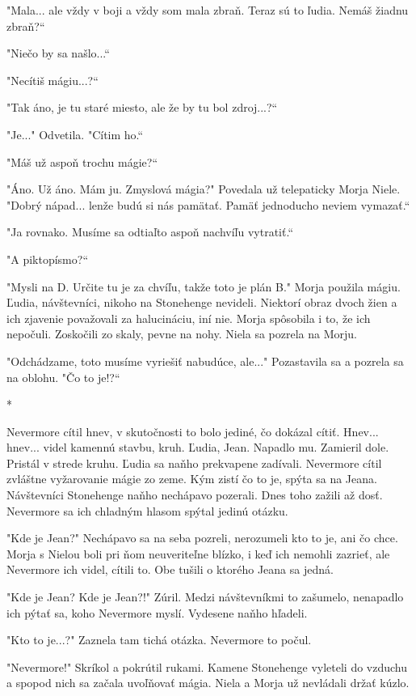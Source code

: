 \documentclass{book}
\begin{document}
"Mala... ale vždy v boji a vždy som mala zbraň. Teraz sú to ľudia. Nemáš žiadnu zbraň?“

"Niečo by sa našlo...“

"Necítiš mágiu...?“

"Tak áno, je tu staré miesto, ale že by tu bol zdroj...?“

"Je..."$ $ Odvetila. "Cítim ho.“

"Máš už aspoň trochu mágie?“

"Áno. Už áno. Mám ju. Zmyslová mágia?"$ $ Povedala už telepaticky Morja Niele. "Dobrý nápad... lenže budú si nás pamätať. Pamäť jednoducho neviem vymazať.“

"Ja rovnako. Musíme sa odtiaľto aspoň nachvíľu vytratiť.“

"$ $A piktopísmo?“

"Mysli na D. Určite tu je za chvíľu, takže toto je plán B."$ $ Morja použila mágiu. Ľudia, návštevníci, nikoho na Stonehenge nevideli. Niektorí obraz dvoch žien a ich zjavenie považovali za halucináciu, iní nie. Morja spôsobila i to, že ich nepočuli. Zoskočili zo skaly, pevne na nohy. Niela sa pozrela na Morju.

"$ $Odchádzame, toto musíme vyriešiť nabudúce, ale..."$ $ Pozastavila sa a pozrela sa na oblohu. "Čo to je!?“

\begin{center}
*
\end{center}

Nevermore cítil hnev, v skutočnosti to bolo jediné, čo dokázal cítiť. Hnev... hnev... videl kamennú stavbu, kruh. Ľudia, Jean. Napadlo mu. Zamieril dole. Pristál v strede kruhu. Ľudia sa naňho prekvapene zadívali. Nevermore cítil zvláštne vyžarovanie mágie zo zeme. Kým zistí čo to je, spýta sa na Jeana. Návštevníci Stonehenge naňho nechápavo pozerali. Dnes toho zažili až dosť. Nevermore sa ich chladným hlasom spýtal jedinú otázku.

"Kde je Jean?"$ $ Nechápavo sa na seba pozreli, nerozumeli kto to je, ani čo chce. Morja s Nielou boli pri ňom neuveriteľne blízko, i keď ich nemohli zazrieť, ale Nevermore ich videl, cítili to. Obe tušili o ktorého Jeana sa jedná.

"Kde je Jean? Kde je Jean?!"$ $ Zúril. Medzi návštevníkmi to zašumelo, nenapadlo ich pýtať sa, koho Nevermore myslí. Vydesene naňho hľadeli.

"Kto to je...?"$ $ Zaznela tam tichá otázka. Nevermore to počul.

"Nevermore!"$ $ Skríkol a pokrútil rukami. Kamene Stonehenge vyleteli do vzduchu a spopod nich sa začala uvoľňovať mágia. Niela a Morja už nevládali držať kúzlo.
\end{document}
